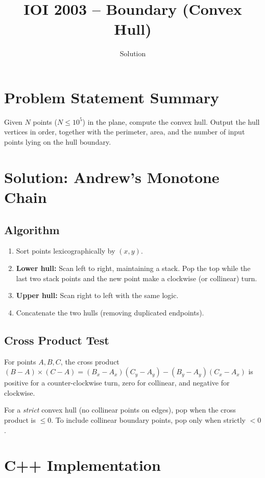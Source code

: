 \documentclass[11pt,a4paper]{article}
\title{IOI 2003 -- Boundary (Convex Hull)}
\author{Solution}
\date{}
\begin{document}
\maketitle

\section{Problem Statement Summary}
Given $N$ points ($N \le 10^5$) in the plane, compute the convex hull.
Output the hull vertices in order, together with the perimeter, area,
and the number of input points lying on the hull boundary.

\section{Solution: Andrew's Monotone Chain}

\subsection{Algorithm}
\begin{enumerate}
  \item Sort points lexicographically by $(x, y)$.
  \item \textbf{Lower hull:} Scan left to right, maintaining a stack.
        Pop the top while the last two stack points and the new point
        make a clockwise (or collinear) turn.
  \item \textbf{Upper hull:} Scan right to left with the same logic.
  \item Concatenate the two hulls (removing duplicated endpoints).
\end{enumerate}

\subsection{Cross Product Test}
For points $A, B, C$, the cross product
$(B - A) \times (C - A) = (B_x - A_x)(C_y - A_y) - (B_y - A_y)(C_x - A_x)$
is positive for a counter-clockwise turn, zero for collinear, and
negative for clockwise.

For a \emph{strict} convex hull (no collinear points on edges), pop
when the cross product is $\le 0$. To include collinear boundary
points, pop only when strictly $< 0$.

\section{C++ Implementation}
\end{document}
